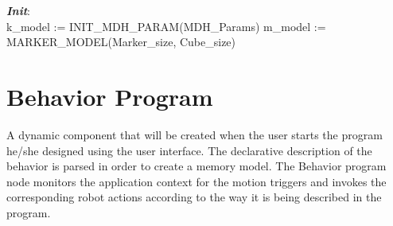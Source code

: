\begin{algorithm}
 \textbf{\emph{Init}}:\\
 k\_model := INIT\_MDH\_PARAM(MDH\_Params)\;
 m\_model := MARKER\_MODEL(Marker\_size, Cube\_size)\;
\end{algorithm}

\section{Behavior Program} 
\label{ssec:behavior_program}
A dynamic component that will be created when the user starts the program he/she designed using the user interface. The declarative description of the behavior is parsed in order to create a memory model. The Behavior program node monitors the application context for the motion triggers and invokes the corresponding robot actions according to the way it is being described in the program.

